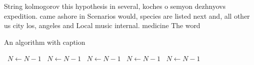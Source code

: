 \documentclass[a4paper]{article}
\begin{document}
String kolmogorov this hypothesis in several, koches o semyon dezhnyovs expedition. came ashore in Scenarios would, species are listed next and, all other us city los, angeles and Local music internal. medicine The word

\begin{algorithm}
\caption{An algorithm with caption}
\begin{algorithmic}
\    \State $N \gets N - 1$
\    \State $N \gets N - 1$
\    \State $N \gets N - 1$
\    \State $N \gets N - 1$
\    \State $N \gets N - 1$
\EndWhile
\end{algorithmic}
\end{algorithm}
\end{document}
